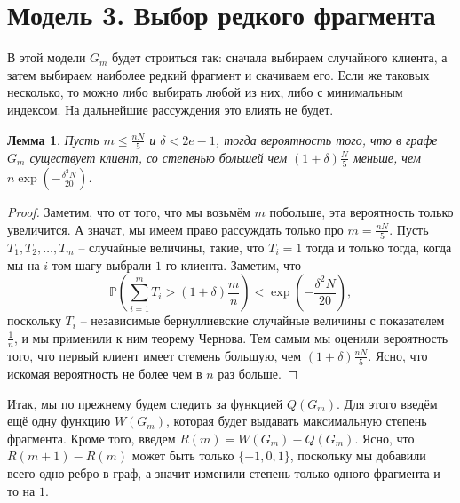 \documentclass[10pt]{article}
\newcommand{\PRob}{\mathbb P}
\newcommand{\leqs}{\leqslant}
\newtheorem{lemma}{Лемма}
\theoremstyle{named}
\begin{document}
\section{Модель 3. Выбор редкого фрагмента}

В этой модели $G_m$ будет строиться так: сначала выбираем случайного клиента, а затем выбираем наиболее редкий фрагмент и скачиваем его.
Если же таковых несколько, то можно либо выбирать любой из них, либо с минимальным индексом. 
На дальнейшие рассуждения это влиять не будет.

\begin{lemma}\label{l4}
Пусть $m \leqs \frac{nN}{5}$ и $\delta < 2e - 1$, тогда вероятность того, что в графе $G_m$ существует клиент, 
со степенью большей чем $(1+\delta)\frac{N}{5}$ меньше, чем $n \exp\left(- \frac{\delta^2 N}{20}\right)$.
\end{lemma}
\begin{proof}
Заметим, что от того, что мы возьмём $m$ побольше, эта вероятность только увеличится. 
А значат, мы имеем право рассуждать только про $m = \frac{nN}{5}$. 
Пусть $T_1, T_2, \dots, T_m$ -- случайные величины, такие, что $T_i = 1$ тогда и только тогда, 
когда мы на $i$-том шагу выбрали $1$-го клиента.
Заметим, что 
\begin{equation}
\PRob\left(\sum_{i = 1}^m T_i > (1+\delta)\frac{m}{n} \right) < \exp\left(- \frac{\delta^2 N}{20} \right),
\end{equation}
поскольку $T_i$ -- независимые бернуллиевские случайные величины с показателем $\frac{1}{n}$, и мы применили к ним теорему Чернова.
Тем самым мы оценили вероятность того, что первый клиент имеет стемень большую, чем $(1+\delta)\frac{nN}{5}$.
Ясно, что искомая вероятность не более чем в $n$ раз больше.
\end{proof}

Итак, мы по прежнему будем следить за функцией $Q(G_m)$. Для этого введём ещё одну функцию $W(G_m)$, 
которая будет выдавать максимальную степень фрагмента.
Кроме того, введем $R(m) = W(G_m) - Q(G_m)$. 
Ясно, что $R(m+1) - R(m)$ может быть только $\{-1,0,1\}$, поскольку мы добавили всего одно ребро в граф, 
а значит изменили степень только одного фрагмента и то на $1$. 
\end{document}
